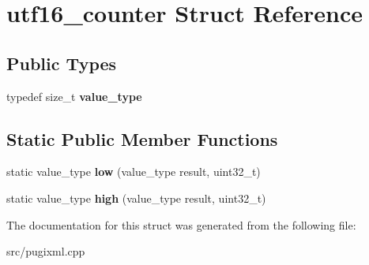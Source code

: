 \hypertarget{structutf16__counter}{}\section{utf16\+\_\+counter Struct Reference}
\label{structutf16__counter}
\subsection*{Public Types}
\begin{DoxyCompactItemize}
\item 
\mbox{\label{structutf16__counter_a0d63f9ca809d182b2f184ef93bd11107}} 
typedef size\+\_\+t {\bfseries value\+\_\+type}
\end{DoxyCompactItemize}
\subsection*{Static Public Member Functions}
\begin{DoxyCompactItemize}
\item 
\mbox{\label{structutf16__counter_a4571f3d0fbf0ce763904ec3321dcb41e}} 
static value\+\_\+type {\bfseries low} (value\+\_\+type result, uint32\+\_\+t)
\item 
\mbox{\label{structutf16__counter_ac1a8793996e57dc28fd22f3165628e4d}} 
static value\+\_\+type {\bfseries high} (value\+\_\+type result, uint32\+\_\+t)
\end{DoxyCompactItemize}


The documentation for this struct was generated from the following file\+:\begin{DoxyCompactItemize}
\item 
src/pugixml.\+cpp\end{DoxyCompactItemize}
